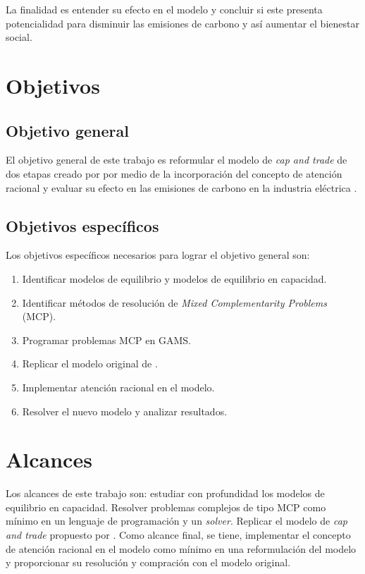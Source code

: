 La finalidad es entender su efecto en el modelo y concluir si este presenta potencialidad para disminuir las emisiones de carbono y así aumentar el bienestar social.


\section{Objetivos}
\subsection{Objetivo general}
El objetivo general de este trabajo es reformular el modelo de \textit{cap and trade} de dos etapas creado por  por medio de la incorporación del concepto de atención racional  y evaluar su efecto en las emisiones de carbono en la industria eléctrica . 

\subsection{Objetivos específicos}
Los objetivos específicos necesarios para lograr el objetivo general son:

\begin{enumerate}
\item Identificar modelos de equilibrio y modelos de equilibrio en capacidad.
\item Identificar métodos de resolución de \emph{Mixed Complementarity Problems} (MCP).
\item Programar problemas MCP en GAMS.
\item Replicar el modelo original de .
\item Implementar atención racional en el modelo.
\item Resolver el nuevo modelo y analizar resultados.
\end{enumerate}


\section{Alcances}

Los alcances de este trabajo son: estudiar con profundidad los modelos de equilibrio en capacidad. Resolver problemas complejos de tipo MCP como mínimo en un lenguaje de programación y un \textit{solver}. Replicar el modelo de \textit{cap and trade} propuesto por . Como alcance final, se tiene, implementar el concepto de atención racional en el modelo como mínimo en una reformulación del modelo y proporcionar su resolución y compración con el modelo original. 
\vspace{2.5mm}

